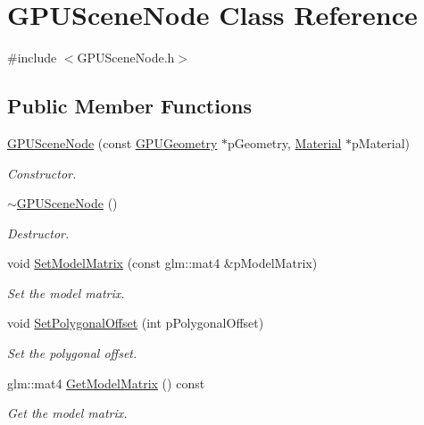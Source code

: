 \hypertarget{class_g_p_u_scene_node}{\section{G\+P\+U\+Scene\+Node Class Reference}
\label{class_g_p_u_scene_node}
}


{\ttfamily \#include $<$G\+P\+U\+Scene\+Node.\+h$>$}

\subsection*{Public Member Functions}
\begin{DoxyCompactItemize}
\item 
\hyperlink{class_g_p_u_scene_node_a64457c63e36283f684ee71ee29021599}{G\+P\+U\+Scene\+Node} (const \hyperlink{class_g_p_u_geometry}{G\+P\+U\+Geometry} $\ast$p\+Geometry, \hyperlink{class_material}{Material} $\ast$p\+Material)
\begin{DoxyCompactList}\small\item\em Constructor. \end{DoxyCompactList}\item 
\hyperlink{class_g_p_u_scene_node_a3cc52ef19aa33fe567ef07e4ed0a9ddf}{$\sim$\+G\+P\+U\+Scene\+Node} ()
\begin{DoxyCompactList}\small\item\em Destructor. \end{DoxyCompactList}\item 
void \hyperlink{class_g_p_u_scene_node_a0bf685402f3717d885c9eab0bb9d8fdf}{Set\+Model\+Matrix} (const glm\+::mat4 \&p\+Model\+Matrix)
\begin{DoxyCompactList}\small\item\em Set the model matrix. \end{DoxyCompactList}\item 
void \hyperlink{class_g_p_u_scene_node_a12181514ad8233033466be881cb7edbb}{Set\+Polygonal\+Offset} (int p\+Polygonal\+Offset)
\begin{DoxyCompactList}\small\item\em Set the polygonal offset. \end{DoxyCompactList}\item 
glm\+::mat4 \hyperlink{class_g_p_u_scene_node_a5d932b7fb37ea771cae5d3c95d112869}{Get\+Model\+Matrix} () const 
\begin{DoxyCompactList}\small\item\em Get the model matrix. \end{DoxyCompactList}\item 

\end{DoxyCompactItemize}
